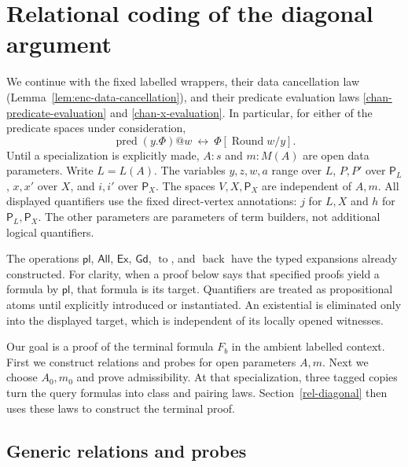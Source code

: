 \section{Relational coding of the diagonal argument}
\label{rel-section}

We continue with the fixed labelled wrappers, their data cancellation law
(Lemma~\ref{lem:enc-data-cancellation}), and their predicate evaluation laws
\eqref{chan-predicate-evaluation} and \eqref{chan-x-evaluation}.
In particular, for either of the
predicate spaces under consideration,
\[
 \operatorname{pred}(y.\Phi)@w
       \ \leftrightarrow\ \Phi[\operatorname{Round}w/y].
\]
Until a specialization is explicitly made, \(A:s\) and \(m:M(A)\) are
open data parameters.  Write \(L=L(A)\).  The variables \(y,z,w,a\)
range over \(L\), \(P,P'\) over \(\mathsf P_L\), \(x,x'\) over \(X\),
and \(i,i'\) over \(\mathsf P_X\).  The spaces \(V,X,\mathsf P_X\)
are independent of \(A,m\).  All displayed quantifiers use the fixed
direct-vertex annotations: \(j\) for \(L,X\) and \(h\) for
\(\mathsf P_L,\mathsf P_X\).  The other parameters are parameters of
term builders, not additional logical quantifiers.

The operations \(\mathsf{pl}\), \(\mathsf{All}\), \(\mathsf{Ex}\),
\(\mathsf{Gd}\), \(\operatorname{to}\), and
\(\operatorname{back}\) have the typed expansions already constructed.
For clarity, when a proof below says that specified proofs yield a
formula by \(\mathsf{pl}\), that formula is its target.  Quantifiers
are treated as propositional atoms until explicitly introduced or
instantiated.  An existential is eliminated only into the displayed
target, which is independent of its locally opened witnesses.

Our goal is a proof of the terminal formula $F_b$ in the ambient labelled
context. First we construct relations and probes for open parameters
$A,m$. Next we choose $A_0,m_0$ and prove admissibility. At that
specialization, three tagged copies turn the query formulas into class
and pairing laws. Section~\ref{rel-diagonal} then uses these laws to
construct the terminal proof.

\subsection{Generic relations and probes}


